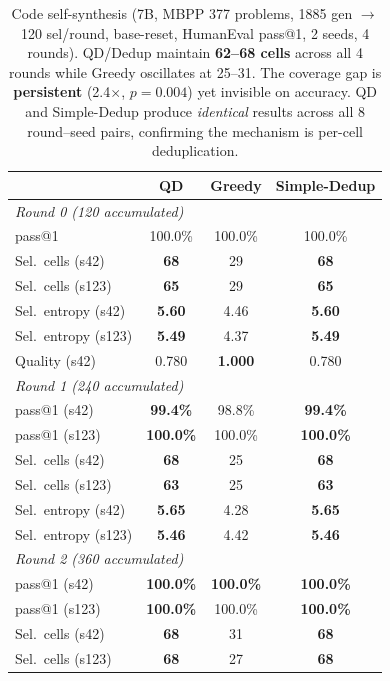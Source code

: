 \documentclass{article}
\begin{document}
\begin{enumerate}[nosep]
\begin{table}[t]
\centering
\caption{Code self-synthesis (7B, MBPP 377 problems, 1885 gen $\to$ 120 sel/round, base-reset, HumanEval pass@1, 2 seeds, 4 rounds). QD/Dedup maintain \textbf{62--68 cells} across all 4 rounds while Greedy oscillates at 25--31. The coverage gap is \textbf{persistent} (2.4$\times$, $p{=}0.004$) yet invisible on accuracy. QD and Simple-Dedup produce \emph{identical} results across all 8 round--seed pairs, confirming the mechanism is per-cell deduplication.}
\label{tab:code_selfsynthesis}
\begin{tabular}{lccc}
\toprule
 & \textbf{QD} & \textbf{Greedy} & \textbf{Simple-Dedup} \\
\midrule
\multicolumn{4}{l}{\textit{Round 0 (120 accumulated)}} \\
pass@1 & 100.0\% & 100.0\% & 100.0\% \\
Sel.\ cells (s42) & \textbf{68} & 29 & \textbf{68} \\
Sel.\ cells (s123) & \textbf{65} & 29 & \textbf{65} \\
Sel.\ entropy (s42) & \textbf{5.60} & 4.46 & \textbf{5.60} \\
Sel.\ entropy (s123) & \textbf{5.49} & 4.37 & \textbf{5.49} \\
Quality (s42) & 0.780 & \textbf{1.000} & 0.780 \\
\midrule
\multicolumn{4}{l}{\textit{Round 1 (240 accumulated)}} \\
pass@1 (s42) & \textbf{99.4\%} & 98.8\% & \textbf{99.4\%} \\
pass@1 (s123) & \textbf{100.0\%} & 100.0\% & \textbf{100.0\%} \\
Sel.\ cells (s42) & \textbf{68} & 25 & \textbf{68} \\
Sel.\ cells (s123) & \textbf{63} & 25 & \textbf{63} \\
Sel.\ entropy (s42) & \textbf{5.65} & 4.28 & \textbf{5.65} \\
Sel.\ entropy (s123) & \textbf{5.46} & 4.42 & \textbf{5.46} \\
\midrule
\multicolumn{4}{l}{\textit{Round 2 (360 accumulated)}} \\
pass@1 (s42) & \textbf{100.0\%} & \textbf{100.0\%} & \textbf{100.0\%} \\
pass@1 (s123) & \textbf{100.0\%} & 100.0\% & \textbf{100.0\%} \\
Sel.\ cells (s42) & \textbf{68} & 31 & \textbf{68} \\
Sel.\ cells (s123) & \textbf{68} & 27 & \textbf{68} \\

\end{tabular}
\end{table}
\end{enumerate}
\end{document}
